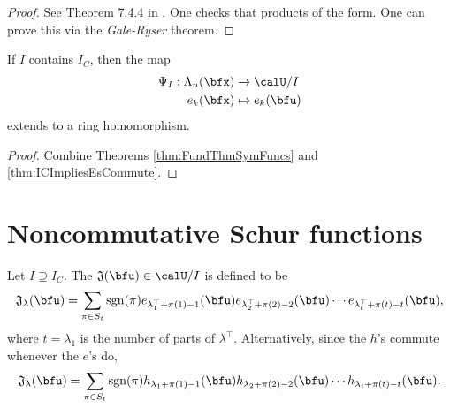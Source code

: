 \documentclass{article}
\newcommand*\frkJ{\mathfrak{J}}
\newcommand*\sgn{\operatorname{sgn}}
\begin{document}
\begin{proof}
    See Theorem 7.4.4 in \cite{EC2}.
    One checks that products of the form.
    One can prove this via the \textit{Gale-Ryser} theorem.
\end{proof}

\begin{corollary}
    If $I$ contains $I_C$, then the map
    \begin{align*}
        \Psi_I:
        \Lambda_n(\bfx)
        &\to
        \calU/I
        \\
        e_k(\bfx)
        &\mapsto
        e_k(\bfu)
    \end{align*}
    extends to a ring homomorphism.
\end{corollary}



\begin{proof}
    Combine Theorems \ref{thm:FundThmSymFuncs} and \ref{thm:ICImpliesEsCommute}.
\end{proof}



\section{
    Noncommutative Schur functions
}

\begin{definition}
    Let $I \supseteq I_C$.
    The  $\frkJ(\bfu) \in \calU/I$ is defined to be
    \[
        \frkJ_\lambda(\bfu)
        =
        \sum_{\pi \in S_{t}}
        \sgn(\pi)
        e_{\lambda^\top_1+\pi(1)-1}(\bfu)
        e_{\lambda^\top_2+\pi(2)-2}(\bfu)
        \cdots
        e_{\lambda^\top_{t}+\pi(t)-t}(\bfu),
    \]
    where $t = \lambda_1$ is the number of parts of $\lambda^\top$.
    Alternatively, since the $h$'s commute whenever the $e$'s do,
    \[
        \frkJ_\lambda(\bfu)
        =
        \sum_{\pi \in S_{t}}
        \sgn(\pi)
        h_{\lambda_1+\pi(1)-1}(\bfu)
        h_{\lambda_2+\pi(2)-2}(\bfu)
        \cdots
        h_{\lambda_t+\pi(t)-t}(\bfu).
    \]
\end{definition}
\end{document}
